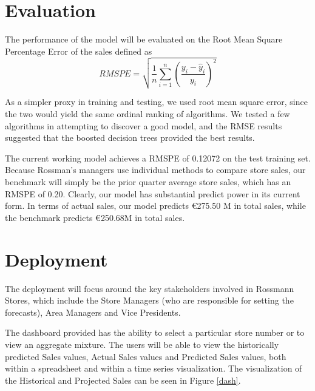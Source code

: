 \documentclass[DIV=calc, paper=a4, fontsize=11pt]{scrartcl}	 %
\begin{document}

\section*{Evaluation}
The performance of the model will be evaluated on the Root Mean Square Percentage Error of the sales defined as 
\[
RMSPE = \sqrt{\frac{1}{n}\sum_{i=1}^n \left(\frac{y_i - \hat{y}_i}{y_i}\right)^2}
\]

As a simpler proxy in training and testing, we used root mean square error, since the two would yield the same ordinal ranking of algorithms. We tested a few algorithms in attempting to discover a good model, and the RMSE results suggested that the boosted decision trees provided the best results. 

The current working model achieves a RMSPE of 0.12072 on the test training set. Because Rossman’s managers use individual methods to compare store sales, our benchmark will simply be the prior quarter average store sales, which has an RMSPE of 0.20. Clearly, our model has substantial predict power in its current form. In terms of actual sales, our model predicts \euro 275.50 M in total sales, while the benchmark predicts \euro 250.68M in total sales.


\section*{Deployment}
The deployment will focus around the key stakeholders involved in Rossmann Stores, which include the Store Managers (who are responsible for setting the forecasts), Area Managers and Vice Presidents. 

The dashboard provided has the ability to select a particular store number or to view an aggregate mixture. The users will be able to view the historically predicted Sales values, Actual Sales values and Predicted Sales values, both within a spreadsheet and within a time series visualization. The visualization of the Historical and Projected Sales can be seen in Figure \ref{dash}. 
\end{document}
